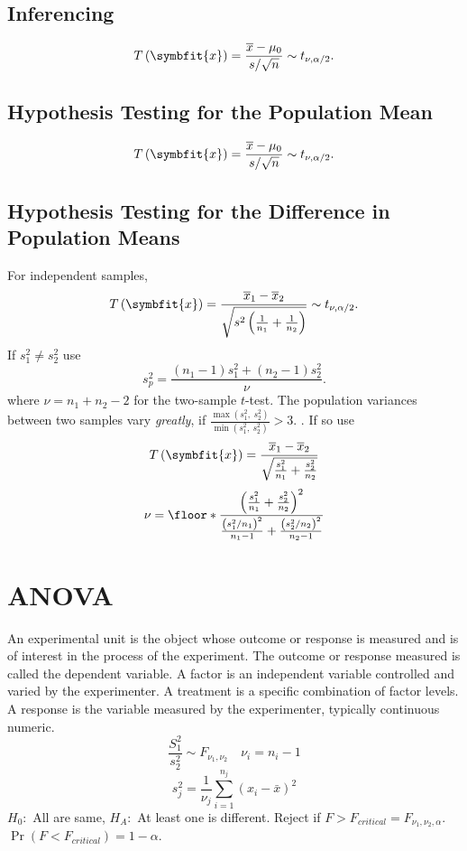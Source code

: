 \documentclass{article}
\begin{document}
\begin{multicols}{3}
\subsection{Inferencing}
\begin{equation*}
    T\left( \symbfit{x} \right) = \frac{\overline{x} - \mu_0}{s / \sqrt{n}} \sim t_{\nu, \alpha/2}.
\end{equation*}
\subsection{Hypothesis Testing for the Population Mean}
\begin{equation*}
    T\left( \symbfit{x} \right) = \frac{\overline{x} - \mu_0}{s/\sqrt{n}} \sim t_{\nu, \alpha/2}.
\end{equation*}
\subsection{Hypothesis Testing for the Difference in Population Means}
For independent samples,
\begin{equation*}
    T\left( \symbfit{x} \right) = \frac{\overline{x}_1 - \overline{x}_2}{\sqrt{s^2\left( \frac{1}{n_1} + \frac{1}{n_2} \right)}} \sim t_{\nu, \alpha/2}.
\end{equation*}
If \(s_1^2 \ne s_2^2\) use 
\begin{equation*}
    s_p^2 = \frac{\left( n_1 - 1 \right)s_1^2 + \left( n_2 - 1 \right)s_2^2}{\nu}.
\end{equation*}
where \(\nu = n_1 + n_2 - 2\) for the two-sample \(t\)-test.
The population variances between two samples vary \textit{greatly}, if
\(
    \frac{\max{\left( s_1^2,\: s_2^2 \right)}}{\min{\left( s_1^2,\: s_2^2 \right)}} > 3.
    \)
    . If so use
\begin{equation*}
    T\left( \symbfit{x} \right) = \frac{\overline{x}_1 - \overline{x}_2 }{\sqrt{\frac{s_1^2}{n_1} + \frac{s_2^2}{n_2}}}
\end{equation*}
\begin{equation*}
    \nu = \floor*{\frac{\left( \frac{s_1^2}{n_1} + \frac{s_2^2}{n_2} \right)^2}{\frac{\left( s_1^2 / n_1 \right)^2}{n_1 - 1} + \frac{\left( s_2^2 / n_2 \right)^2}{n_2 - 1}}}
\end{equation*}


\section{ANOVA}
An experimental unit is the object whose outcome or response is measured and is of interest in the process of the experiment.
The outcome or response measured is called the dependent variable.
A factor is an independent variable controlled and varied by the experimenter.
A treatment is a specific combination of factor levels.
A response is the variable measured by the experimenter, typically continuous numeric.
\[
    \frac{S^2_1}{s^2_2} \sim F_{\nu_1,\nu_2} \quad \nu_i=n_i-1
\]
\[
    s^2_j = \frac{1}{\nu_j} \sum_{i=1}^{n_j} \left( x_i - \bar{x} \right)^2
\]
\(H_0:\) All are same, \(H_A:\) At least one is different.
Reject if \(F>F_{critical}=F_{\nu_1,\nu_2,\alpha}\).
\(\Pr\left( F<F_{critical} \right)=1-\alpha\).

\end{multicols}
\end{document}
